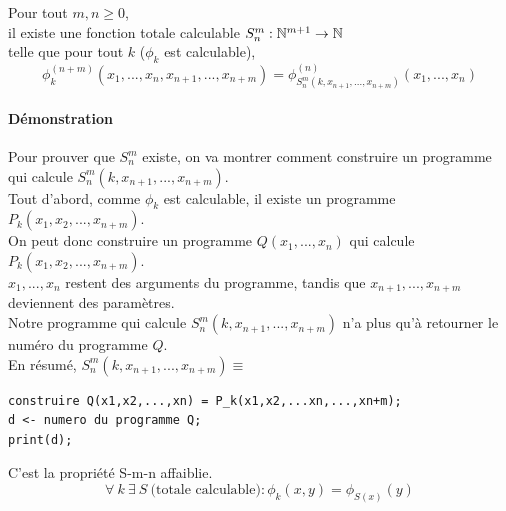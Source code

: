 \begin{mytheo}[S-m-n] 
	\label{S-m-n}Pour tout $m,n \geq 0$, \\
	il existe une fonction totale calculable $S^m_n : \mathbb{N}^{m+1} \rightarrow 
	\mathbb{N}$ \\
	telle que pour tout $k$ ($\phi_k$ est calculable),
	$$ \phi^{(n+m)}_k(x_1,...,x_n,x_{n+1},...,x_{n+m}) = 
	\phi^{(n)}_{S^m_n(k,x_{n+1}, ...,x_{n+m})} (x_1,...,x_n)$$
\end{mytheo}

\paragraph{Démonstration}
	Pour prouver que $S^m_n$ existe, on va montrer comment construire un programme qui 
	calcule  $S^m_n(k,x_{n+1}, ...,x_{n+m})$.\\
	Tout d'abord, comme $\phi_k$ est calculable, il existe un programme  
	$P_k(x_1,x_2,...,x_{n+m})$.\\
	On peut donc construire un programme $Q(x_1,...,x_n)$ qui calcule 
	$P_k(x_1,x_2,...,x_{n+m})$.\\
	$x_1,...,x_n$ restent des arguments du programme,
	tandis que $x_{n+1},...,x_{n+m}$ deviennent des paramètres.\\
	Notre programme qui calcule $S^m_n(k,x_{n+1}, ...,x_{n+m})$ n'a plus 
	qu'à retourner le numéro du programme $Q$.\\
       	En résumé, $S^m_n(k,x_{n+1},
	...,x_{n+m}) \equiv$
	\begin{lstlisting}
construire Q(x1,x2,...,xn) = P_k(x1,x2,...xn,...,xn+m);
d <- numero du programme Q;
print(d);
	\end{lstlisting}

\begin{mytheo}[S]
	C'est la propriété S-m-n affaiblie.
	\[ \forall \ k \ \exists \ S \ \text{(totale calculable)} : \phi_k(x,y)=\phi_{S(x)}(y)\]
\end{mytheo}

